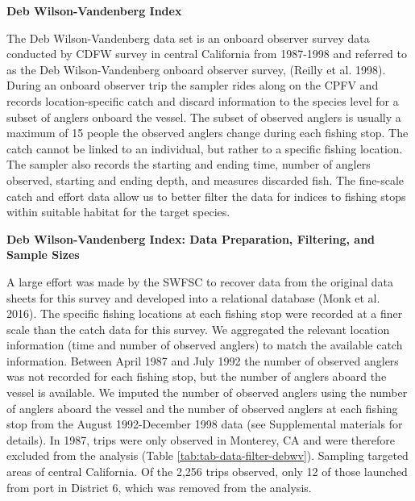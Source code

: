 \documentclass[11pt,
  english,
]{article}
\begin{document}
\leavevmode\tagmcend\tagstructend

\renewcommand{\thepage}{D\arabic{page}}
\renewcommand{\thefigure}{D\arabic{figure}}
\renewcommand{\thetable}{D\arabic{table}}
\setcounter{page}{1}
\setcounter{figure}{0}
\setcounter{table}{0}

\textbf{Deb Wilson-Vandenberg Index}

The Deb Wilson-Vandenberg data set is an onboard observer survey data conducted by CDFW survey in central California from 1987-1998 and referred to as the Deb Wilson-Vandenberg onboard observer survey, {(Reilly et al. 1998)\leavevmode\tagmcend\tagstructend}. During an onboard observer trip the sampler rides along on the CPFV and records location-specific catch and discard information to the species level for a subset of anglers onboard the vessel. The subset of observed anglers is usually a maximum of 15 people the observed anglers change during each fishing stop. The catch cannot be linked to an individual, but rather to a specific fishing location. The sampler also records the starting and ending time, number of anglers observed, starting and ending depth, and measures discarded fish. The fine-scale catch and effort data allow us to better filter the data for indices to fishing stops within suitable habitat for the target species.

\textbf{Deb Wilson-Vandenberg Index: Data Preparation, Filtering, and Sample Sizes}

A large effort was made by the SWFSC to recover data from the original data sheets for this survey and developed into a relational database {(Monk et al. 2016)\leavevmode\tagmcend\tagstructend}. The specific fishing locations at each fishing stop were recorded at a finer scale than the catch data for this survey. We aggregated the relevant location information (time and number of observed anglers) to match the available catch information. Between April 1987 and July 1992 the number of observed anglers was not recorded for each fishing stop, but the number of anglers aboard the vessel is available. We imputed the number of observed anglers using the number of anglers aboard the vessel and the number of observed anglers at each fishing stop from the August 1992-December 1998 data (see Supplemental materials for details). In 1987, trips were only observed in Monterey, CA and were therefore excluded from the analysis (Table \ref{tab:tab-data-filter-debwv}). Sampling targeted areas of central California. Of the 2,256 trips observed, only 12 of those launched from port in District 6, which was removed from the analysis.
\end{document}

